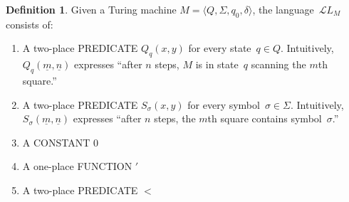 \documentclass[10pt,a4paper]{article}
\newcommand*{\olup}[1]{\MakeUppercase{#1}}
\theoremstyle{plain}
\theoremstyle{definition}
\newtheorem{defn}[thm]{Definition}
\theoremstyle{remark}
\newcommand*{\ollabel}[1]{\label{#1}}
\providecommand{\Obj}{}
\providecommand{\Lang}{\ensuremath{\mathcal{L}}}
\providecommand{\tuple}[1]{\langle #1 \rangle}
\providecommand{\num}[1]{\underline{#1}}
\begin{document}
\begin{defn}
  \ollabel{defn:tm-descr}
Given a Turing machine $M = \tuple{Q, \Sigma, q_0, \delta}$, the
language~$\Lang L_M$ consists of:
\begin{enumerate}
\item A two-place \olup{predicate} $\Obj Q_q(x, y)$ for every state~$q \in
  Q$.  Intuitively, $\Obj Q_q(\num{m}, \num{n})$ expresses ``after $n$
  steps, $M$ is in state~$q$ scanning the $m$th square.''
\item A two-place \olup{predicate} $\Obj S_\sigma(x, y)$ for every
  symbol~$\sigma\in \Sigma$.  Intuitively, $\Obj S_\sigma(\num{m},
  \num{n})$ expresses ``after $n$ steps, the $m$th square contains
  symbol~$\sigma$.''
\item A \olup{constant} $\Obj 0$
\item A one-place \olup{function} $\prime$
\item A two-place \olup{predicate} $<$
\end{enumerate}
\end{defn}
\end{document}

